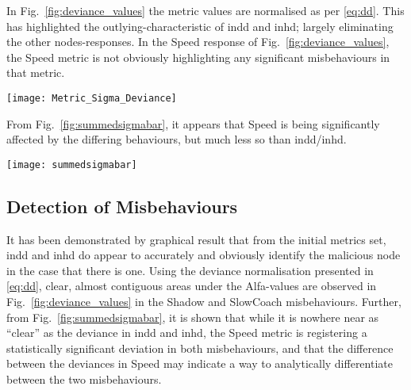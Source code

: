 \begin{comment}
\begin{figure*}
  \centering
  \texttt{[image: Metric\_Deviation]}
  \caption{\emph{Unnecessary but included for draft discussion} Observed Metric Values for one simulation of each behaviour ($d_{i,j}^{m,t}$ from Fig.~\ref{fig:workflow})}
\end{figure*}
\end{comment}

In Fig.~\ref{fig:deviance_values} the metric values are normalised as per \autoref{eq:dd}.
This has highlighted the outlying-characteristic of \gls{indd} and \gls{inhd}; largely eliminating the other nodes-responses.
In the Speed response of Fig.~\ref{fig:deviance_values}, the Speed metric is not obviously highlighting any significant misbehaviours in that metric. 

\begin{figure*}
  \centering
  \texttt{[image: Metric\_Sigma\_Deviance]}
  \caption{Normalised Deviance values from one simulation of each behaviour ($\alpha_{i,j}^{m,t}$ from \autoref{eq:dd})}
  \label{fig:deviance_values}
\end{figure*}

From Fig.~\ref{fig:summedsigmabar}, it appears that Speed is being significantly affected by the differing behaviours, but much less so than \gls{indd}/\gls{inhd}.  

\begin{figure*}
  \centering
  \texttt{[image: summedsigmabar]}
  \caption{Per-Node-Per-Run deviance for each metric, normalised in time ($\sum\alpha/T$)}
  \label{fig:summedsigmabar}
\end{figure*}

\subsection{Detection of Misbehaviours}
It has been demonstrated by graphical result that from the initial metrics set, \gls{indd} and \gls{inhd} do appear to accurately and obviously identify the malicious node in the case that there is one. 
Using the deviance normalisation presented in \autoref{eq:dd}, clear, almost contiguous areas under the Alfa-values are observed in Fig.~\ref{fig:deviance_values} in the Shadow and SlowCoach misbehaviours.
Further, from Fig.~\ref{fig:summedsigmabar}, it is shown that while it is nowhere near as ``clear'' as the deviance in \gls{indd} and \gls{inhd}, the Speed metric is registering a statistically significant deviation in both misbehaviours, and that the difference between the deviances in Speed may indicate a way to analytically differentiate between the two misbehaviours.

